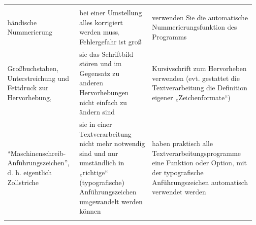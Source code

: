\documentclass[]{book}
\theoremstyle{definition}
\theoremstyle{definition}
\theoremstyle{definition}
\theoremstyle{remark}
\begin{document}
\begin{longtable}[]{@{}lll@{}}
\begin{minipage}[t]{0.38\columnwidth}
\end{minipage}\tabularnewline
\begin{minipage}[t]{0.13\columnwidth}\raggedright\strut
händische Nummerierung\strut
\end{minipage} & \begin{minipage}[t]{0.41\columnwidth}\raggedright\strut
bei einer Umstellung alles korrigiert werden muss, Fehlergefahr ist
groß\strut
\end{minipage} & \begin{minipage}[t]{0.38\columnwidth}\raggedright\strut
verwenden Sie die automatische Nummerierungsfunktion des Programms
\vspace{-6mm}\strut
\end{minipage}\tabularnewline
\begin{minipage}[t]{0.13\columnwidth}\raggedright\strut
Großbuchstaben, Unterstreichung und Fettdruck zur Hervorhebung,\strut
\end{minipage} & \begin{minipage}[t]{0.41\columnwidth}\raggedright\strut
sie das Schriftbild stören und im Gegensatz zu anderen Hervorhebungen
nicht einfach zu ändern sind\strut
\end{minipage} & \begin{minipage}[t]{0.38\columnwidth}\raggedright\strut
Kursivschrift zum Hervorheben verwenden (evt. gestattet die
Textverarbeitung die Definition eigener „Zeichenformate``)
\vspace{-6mm}\strut
\end{minipage}\tabularnewline
\begin{minipage}[t]{0.13\columnwidth}\raggedright\strut
``Maschinenschreib-Anführungszeichen'', d. h. eigentlich
Zollstriche\strut
\end{minipage} & \begin{minipage}[t]{0.41\columnwidth}\raggedright\strut
sie in einer Textverarbeitung nicht mehr notwendig sind und nur
umständlich in „richtige`` (typografische) Anführungszeichen umgewandelt
werden können\strut
\end{minipage} & \begin{minipage}[t]{0.38\columnwidth}\raggedright\strut
haben praktisch alle Textverarbeitungsprogramme eine Funktion oder
Option, mit der typografische Anführungszeichen automatisch verwendet
werden \vspace{-6mm}\strut
\end{minipage}\tabularnewline
\begin{minipage}[t]{0.13\columnwidth}\raggedright\strut

\end{minipage}
\end{longtable}
\end{document}

